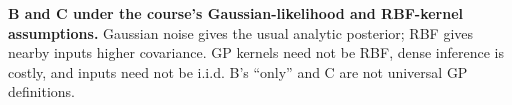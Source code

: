\textbf{B and C under the course’s Gaussian-likelihood and RBF-kernel assumptions.} Gaussian noise gives the usual analytic posterior; RBF gives nearby inputs higher covariance. GP kernels need not be RBF, dense inference is costly, and inputs need not be i.i.d. B’s “only” and C are not universal GP definitions.
